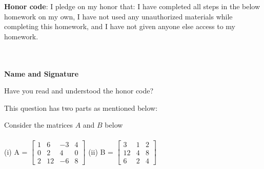 \documentclass[solution,addpoints,12pt]{exam}
\begin{document}
\noindent \textbf{Honor code}: I pledge on my honor that: I have completed all steps in the below homework on my own, I have not used any unauthorized materials while completing this homework, and I have not given anyone else access to my homework.
\\~\\~\\
\begin{flushright}
\textbf{Name and Signature}

\end{flushright}


\begin{questions}

\question[1] Have you read and understood the honor code?
\begin{solution}

\end{solution}



\question[2] 
This question has two parts as mentioned below:


\question[2] 
Consider the matrices $A$ and $B$ below\\
\\
(i) A = $
\begin{bmatrix}
1 & 6 & -3 & 4 \\
0 & 2 & 4 & 0 \\
2 & 12 & -6 & 8 
\end{bmatrix}
$
(ii) B = $
\begin{bmatrix}
3 & 1 & 2 \\
12 & 4 & 8 \\
6 & 2 & 4
\end{bmatrix}
$
\\
\begin{parts}

\end{parts}
\end{questions}
\end{document}
